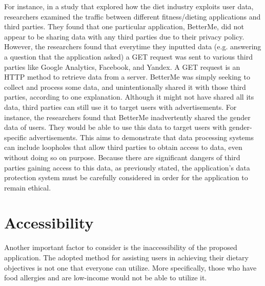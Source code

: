 \documentclass[10pt,twocolumn]{article}
\begin{document}
For instance, in a study that explored how the diet industry exploits user data, researchers examined the traffic between different fitness/dieting applications and third parties.\cite{privacy international} They found that one particular application, BetterMe, did not appear to be sharing data with any third parties due to their privacy policy. However, the researchers found that everytime they inputted data (e.g. answering a question that the application asked) a GET request was sent to various third parties like Google Analytics, Facebook, and Yandex. A GET request is an HTTP method to retrieve data from a server. BetterMe was simply seeking to collect and process some data, and unintentionally shared it with those third parties, according to one explanation. Although it might not have shared all its data, third parties can still use it to target users with advertisements. For instance, the researchers found that BetterMe inadvertently shared the gender data of users. They would be able to use this data to target users with gender-specific advertisements. This aims to demonstrate that data processing systems can include loopholes that allow third parties to obtain access to data, even without doing so on purpose. Because there are significant dangers of third parties gaining access to this data, as previously stated, the application's data protection system must be carefully considered in order for the application to remain ethical. 

\section{Accessibility}
Another important factor to consider is the inaccessibility of the proposed application. The adopted method for assisting users in achieving their dietary objectives is not one that everyone can utilize. More specifically, those who have food allergies and are low-income would not be able to utilize it. 
\end{document}
